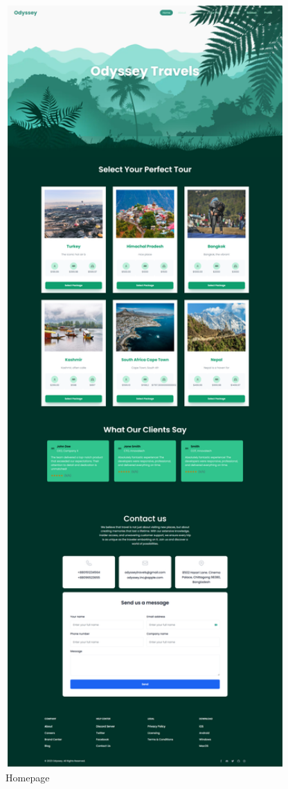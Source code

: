 \begin{figure}[H]
    \centering
    \includegraphics[width=0.95\textwidth]{./figures/frontend/1.png}
    \caption{Homepage}
    \label{fig:homepage}
\end{figure}


